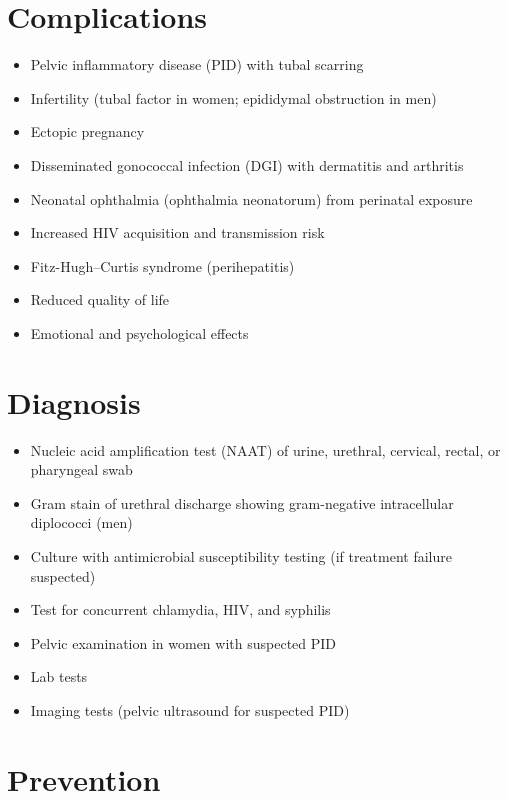 \section{Complications}

\begin{itemize}[noitemsep]
  \item Pelvic inflammatory disease (PID) with tubal scarring
  \item Infertility (tubal factor in women; epididymal obstruction in men)
  \item Ectopic pregnancy
  \item Disseminated gonococcal infection (DGI) with dermatitis and arthritis
  \item Neonatal ophthalmia (ophthalmia neonatorum) from perinatal exposure
  \item Increased HIV acquisition and transmission risk
  \item Fitz-Hugh--Curtis syndrome (perihepatitis)
  \item Reduced quality of life
  \item Emotional and psychological effects
\end{itemize}

\section{Diagnosis}

\begin{itemize}[noitemsep]
  \item Nucleic acid amplification test (NAAT) of urine, urethral, cervical, rectal, or pharyngeal swab
  \item Gram stain of urethral discharge showing gram-negative intracellular diplococci (men)
  \item Culture with antimicrobial susceptibility testing (if treatment failure suspected)
  \item Test for concurrent chlamydia, HIV, and syphilis
  \item Pelvic examination in women with suspected PID
  \item Lab tests
  \item Imaging tests (pelvic ultrasound for suspected PID)
\end{itemize}

\section{Prevention}

